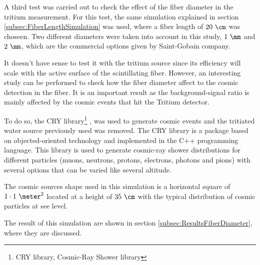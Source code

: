 A third test was carried out to check the effect of the fiber diameter in the tritium measurement. For this test, the same simulation explained in section \ref{subsec:FiberLengthSimulation} was used, where a fiber length of $20~\cm$ was choseen. Two different diameters were taken into account in this study, $1~\mm$ and $2~\mm$, which are the commercial options given by Saint-Gobain company.

It doesn't have sense to test it with the tritium source since its efficiency will scale with the active surface of the scintillating fiber. However, an interesting study can be performed to check how the fiber diameter affect to the cosmic detection in the fiber. It is an important result as the background-signal ratio is mainly affected by the cosmic events that hit the Tritium detector.

To do so, the CRY library\footnote{CRY library, Cosmic-Ray Shower library} \cite{CRYwebsite}, \cite{CRYpaper} was used to generate cosmic events and the tritiated water source previously used was removed. The CRY library is a package based on objected-oriented technology and implemented in the C++ programming language. This library is used to generate cosmic-ray shower distributions for different particles (muons, neutrons, protons, electrons, photons and pions) with several options that can be varied like several altitude.

The cosmic sources shape used in this simulation is a horizontal square of $1\cdot 1~\meter ^2$ located at a height of $35~\cm$ with the typical distribution of cosmic particles at see level.

The result of this simulation are shown in section \ref{subsec:ResultsFiberDiameter}, where they are discussed.